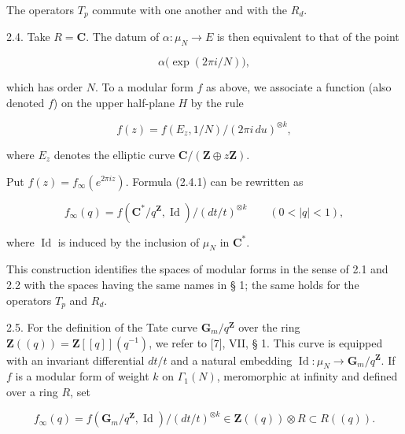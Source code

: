 \documentclass[10pt,oneside]{article}
\begin{document}
The operators \(T_p\) commute with one another and with the \(R_d\).\par

2.4. Take \(R=\mathbf{C}\). The datum of \(\alpha:\mu_N\longrightarrow E\) is then equivalent to that of the point\par

\begin{equation*}
\alpha\bigl(\exp(2\pi i/N)\bigr),
\end{equation*}

which has order \(N\). To a modular form \(f\) as above, we associate a function (also denoted \(f\)) on the upper half-plane \(H\) by the rule\par

\begin{equation*}
\tag{2.4.1}
f(z)=f(E_z,1/N)/(2\pi i\,du)^{\otimes k},
\end{equation*}

where \(E_z\) denotes the elliptic curve \(\mathbf{C}/(\mathbf{Z}\oplus z\mathbf{Z})\).\par

Put \(f(z)=f_\infty(e^{2\pi iz})\). Formula (2.4.1) can be rewritten as\par

\begin{equation*}
\tag{2.4.2}
f_\infty(q)=f(\mathbf{C}^*/q^{\mathbf{Z}},\operatorname{Id})/(dt/t)^{\otimes k}
\qquad(0<|q|<1),
\end{equation*}

where \(\operatorname{Id}\) is induced by the inclusion of \(\mu_N\) in \(\mathbf{C}^*\).\par

This construction identifies the spaces of modular forms in the sense of 2.1 and 2.2 with the spaces having the same names in § 1; the same holds for the operators \(T_p\) and \(R_d\).\par

2.5. For the definition of the Tate curve \(\mathbf{G}_m/q^{\mathbf{Z}}\) over the ring \(\mathbf{Z}((q))=\mathbf{Z}[[q]](q^{-1})\), we refer to [7], VII, § 1. This curve is equipped with an invariant differential \(dt/t\) and a natural embedding \(\operatorname{Id}:\mu_N\longrightarrow\mathbf{G}_m/q^{\mathbf{Z}}\). If \(f\) is a modular form of weight \(k\) on \(\Gamma_1(N)\), meromorphic at infinity and defined over a ring \(R\), set\par

\begin{equation*}
f_\infty(q)=f(\mathbf{G}_m/q^{\mathbf{Z}},\operatorname{Id})/(dt/t)^{\otimes k}
\in\mathbf{Z}((q))\otimes R\subset R((q)).
\end{equation*}
\end{document}
